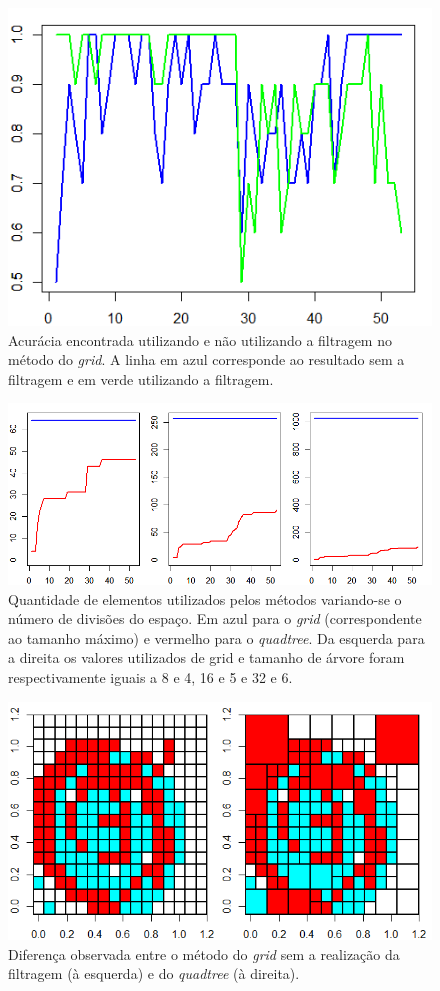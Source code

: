 \documentclass[conference]{IEEEtran}
\begin{document}
\begin{figure}[h]
\centerline{\includegraphics[width=0.9\columnwidth]{fig/acc_filt.png}}
\caption{Acurácia encontrada utilizando e não utilizando a filtragem no método do \textit{grid}. A linha em azul corresponde ao resultado sem a filtragem e em verde utilizando a filtragem.}
\label{accfilt}
\end{figure}

\begin{figure}[h]
\centerline{\includegraphics[width=0.9\columnwidth]{fig/mem_parts.png}}
\caption{Quantidade de elementos utilizados pelos métodos variando-se o número de divisões do espaço. Em azul para o \textit{grid} (correspondente ao tamanho máximo) e vermelho para o \textit{quadtree}. Da esquerda para a direita os valores utilizados de grid e tamanho de árvore foram respectivamente iguais a 8 e 4, 16 e 5 e 32 e 6.}
\label{memparts}
\end{figure}

\begin{figure}[h]
\centerline{\includegraphics[width=0.7\columnwidth]{fig/off.png}}
\caption{Diferença observada entre o método do \textit{grid} sem a realização da filtragem (à esquerda) e do \textit{quadtree} (à direita).}
\label{off}
\end{figure}
\end{document}
